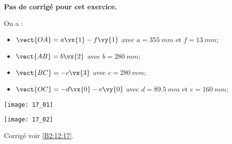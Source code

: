 \normalfalse \difficilefalse \tdifficiletrue
\correctionfalse


\setcounter{numques}{0}
\ifcorrection
\else
\textbf{Pas de corrigé pour cet exercice.}
\fi

\ifprof
\else
On a : 
\begin{itemize}
\item $\vect{OA} = a \vx{1}-f \vy{1}$ avec $a=\SI{355}{mm}$ et $f=\SI{13}{mm}$;
\item $\vect{AB} = b \vx{2}$ avec $b=\SI{280}{mm}$;
\item $\vect{BC} = -c \vx{3}$ avec $c=\SI{280}{mm}$;
\item $\vect{OC} = -d \vx{0}-e\vy{0}$ avec $d=\SI{89,5}{mm}$ et $e=\SI{160}{mm}$;
\end{itemize}

\begin{center}
\texttt{[image: 17\_01]}

\texttt{[image: 17\_02]}
\end{center}
\fi

\ifprof
\else
\fi

\ifprof
\else
\fi

\ifprof
\else
\fi


\ifprof
\else
\fi



\ifprof
\else
\begin{flushright}
\footnotesize{Corrigé  voir \ref{B2:12:17}.}
\end{flushright}%
\fi